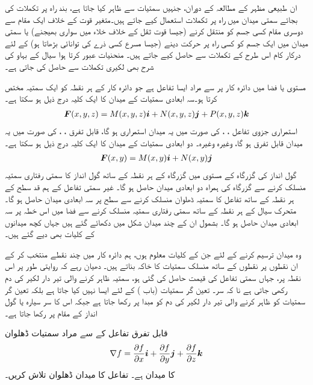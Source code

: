 ان طبیعی  مظہر  کے مطالعہ کے دوران، جنہیں سمتیات سے ظاہر کیا جاتا ہے، بند راہ پر تکملات کی بجائے سمتی میدان میں راہ پر تکملات استعمال کیے جاتے ہیں۔متغیر قوت کے خلاف ایک مقام سے دوسری مقام کسی جسم کو منتقل کرنے (جیسا قوت ثقل کے خلاف خلاء میں سواری بھیجنے)   یا سمتی میدان میں ایک جسم کو کسی راہ پر حرکت دینے (جیسا مسرع کسی ذرے کی توانائی بڑھاتا ہو)  کے لئے درکار کام   اس طرح کے تکملات سے حاصل کیے  جاتے ہیں۔  منحنیات عبور کرتا ہوا سیال کے بہاو کی شرح بھی لکیری تکملات سے حاصل کی جاتی ہے۔

مستوی یا فضا میں دائرہ کار پر   سے مراد ایسا تفاعل ہے جو دائرہ کار کے ہر نقطہ کو ایک سمتیہ مختص کرتا ہو۔سہ ابعادی سمتیات کے میدان کا ایک کلیہ درج ذیل ہو سکتا ہے۔
\begin{align*}
{\ensuremath{{\boldsymbol{F}}}}(x,y,z)=M(x,y,z){\boldsymbol{i}}+N(x,y,z){\boldsymbol{j}}+P(x,y,z){\boldsymbol{k}}
\end{align*}
استمراری جزوی تفاعل ، ،  کی صورت میں یہ میدان استمراری ہو گا، قابل تفرق ، ،  کی صورت میں یہ میدان قابل تفرق ہو گا، وغیرہ وغیرہ۔ دو ابعادی سمتیات کے میدان کا ایک کلیہ درج ذیل ہو سکتا ہے۔
\begin{align*}
{\ensuremath{{\boldsymbol{F}}}}(x,y)=M(x,y){\boldsymbol{i}}+N(x,y){\boldsymbol{j}}
\end{align*}
گول انداز کی گزرگاہ کے مستوی میں  گزرگاہ کے ہر نقطہ کے ساتھ گول انداز کا سمتی رفتاری سمتیہ منسلک کرنے سے گزرگاہ  کی ہمراہ دو ابعادی میدان حاصل ہو گا۔  غیر سمتی تفاعل کے ہم قد سطح کے ہر نقطہ کے ساتھ  تفاعل کا سمتیہ ڈھلوان منسلک کرنے سے سطح پر سہ ابعادی میدان حاصل ہو گا۔   متحرک سیال کے ہر نقطہ کے ساتھ سمتی رفتاری سمتیہ منسلک کرنے سے فضا میں اس خطہ پر سہ ابعادی  میدان حاصل ہو گا۔ بشمول ان  کے چند  میدان  شکل میں دکھائے گئے ہیں جہاں کچھ میدانوں کے کلیات بھی دیے گئے ہیں۔
 

وہ میدان ترسیم کرنے کے لئے جن کے کلیات معلوم ہوں، ہم دائرہ کار میں چند نقطے منتخب کر کے ان نقطوں پر نقطوں کے ساتھ منسلک سمتیات  کا خاکہ بناتے ہیں۔ دھیان رہے کہ روایتی طور پر اس نقطہ پر، جہاں سمتی تفاعل کی قیمت حاصل کی گئی ہو،  سمتیہ ظاہر کرنے والی تیر دار لکیر  کی دم  رکھی جاتی ہے نا کہ سر۔ تعین گر سمتیات (باب ) کے لئے ایسا نہیں کیا جاتا ہے بلکہ تعین گر سمتیات کو ظاہر کرنے والی تیر دار لکیر کی دم کو مبدا پر رکھا جاتا ہے جبکہ اس کا سر  سیارہ یا گول انداز کے مقام پر رکھا جاتا ہے۔

قابل تفرق تفاعل  کے  سے مراد سمتیات ڈھلوان
\begin{align*}
\nabla f=\frac{\partial f}{\partial x}{\boldsymbol{i}}+\frac{\partial f}{\partial y}{\boldsymbol{j}}+\frac{\partial f}{\partial z}{\boldsymbol{k}}
\end{align*}
 کا میدان ہے۔
تفاعل  کا میدان ڈھلوان تلاش کریں۔

